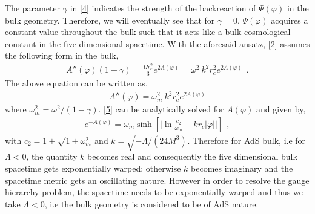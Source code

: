 \documentclass{article}
\begin{document}
The parameter $\gamma$ in \ref{4} indicates the strength of the backreaction of $\Psi(\varphi)$ in the bulk geometry. Therefore, we will eventually see that for $\gamma = 0$, $\Psi(\varphi)$ acquires a constant value throughout the bulk such that it acts  like a bulk cosmological constant in the five dimensional spacetime. With the aforesaid ansatz, \ref{2} assumes the following form in the bulk,
\begin{eqnarray}
 A''(\varphi)(1-\gamma) = \frac{\Omega r_c^2}{3}e^{2A(\varphi)}=\omega^2~k^2r_c^2e^{2A(\varphi)}~~.
 \label{4a}
\end{eqnarray}
The above equation can be written as,
\begin{eqnarray}
 A''(\varphi) = \omega_m^2~k^2r_c^2e^{2A(\varphi)}
 \label{5}
\end{eqnarray}
where $\omega_m^2 = \omega^2/(1-\gamma)$. \ref{5} can be analytically solved for $A(\varphi)$ and given by,
\begin{eqnarray}
 e^{-A(\varphi)} = \omega_m\sinh\left[\Big|\ln{\frac{c_2}{\omega_m}} - kr_c|\varphi|\Big|\right]~~,
 \label{6}
\end{eqnarray}
with $c_2 = 1 + \sqrt{1 + \omega_m^2}$ and $k = \sqrt{-\Lambda/\left(24M^3\right)}$. Therefore for AdS bulk, i.e for $\Lambda < 0$, 
the quantity $k$ becomes real and consequently the five dimensional bulk spacetime gets exponentially warped; otherwise $k$ becomes 
imaginary and the spacetime metric gets an oscillating nature. However in order to resolve the gauge hierarchy problem, the spacetime needs to be 
exponentially warped and thus we take $\Lambda < 0$, i.e the bulk geometry is considered to be of AdS nature. 
\end{document}
